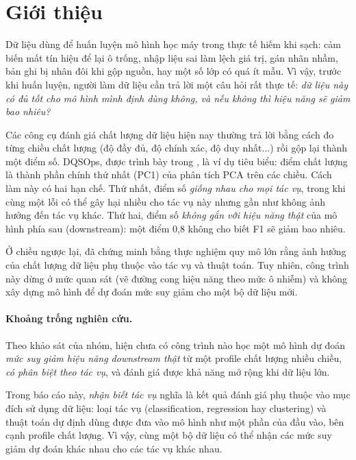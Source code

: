 \section{Giới thiệu}
\label{sec:gioi-thieu}

Dữ liệu dùng để huấn luyện mô hình học máy trong thực tế hiếm khi sạch: cảm biến mất tín hiệu để lại ô trống, nhập liệu sai làm lệch giá trị, gán nhãn nhầm, bản ghi bị nhân đôi khi gộp nguồn, hay một số lớp có quá ít mẫu. Vì vậy, trước khi huấn luyện, người làm dữ liệu cần trả lời một câu hỏi rất thực tế: \emph{dữ liệu này có đủ tốt cho mô hình mình định dùng không, và nếu không thì hiệu năng sẽ giảm bao nhiêu?}

Các công cụ đánh giá chất lượng dữ liệu hiện nay thường trả lời bằng cách đo từng chiều chất lượng (độ đầy đủ, độ chính xác, độ duy nhất...) rồi gộp lại thành một điểm số. DQSOps, được trình bày trong \bbDQS{}, là ví dụ tiêu biểu: điểm chất lượng là thành phần chính thứ nhất (PC1) của phân tích PCA trên các chiều. Cách làm này có hai hạn chế. Thứ nhất, điểm số \emph{giống nhau cho mọi tác vụ}, trong khi cùng một lỗi có thể gây hại nhiều cho tác vụ này nhưng gần như không ảnh hưởng đến tác vụ khác. Thứ hai, điểm số \emph{không gắn với hiệu năng thật} của mô hình phía sau (downstream): một điểm 0,8 không cho biết F1 sẽ giảm bao nhiêu.

Ở chiều ngược lại, \bbMoh{} đã chứng minh bằng thực nghiệm quy mô lớn rằng ảnh hưởng của chất lượng dữ liệu phụ thuộc vào tác vụ và thuật toán. Tuy nhiên, công trình này dừng ở mức quan sát (vẽ đường cong hiệu năng theo mức ô nhiễm) và không xây dựng mô hình để dự đoán mức suy giảm cho một bộ dữ liệu mới.

\paragraph{Khoảng trống nghiên cứu.} Theo khảo sát của nhóm, hiện chưa có công trình nào học một mô hình dự đoán \emph{mức suy giảm hiệu năng downstream thật} từ một profile chất lượng nhiều chiều, \emph{có phân biệt theo tác vụ}, và đánh giá được khả năng mở rộng khi dữ liệu lớn.

Trong báo cáo này, \emph{nhận biết tác vụ} nghĩa là kết quả đánh giá phụ thuộc vào mục đích sử dụng dữ liệu: loại tác vụ (classification, regression hay clustering) và thuật toán dự định dùng được đưa vào mô hình như một phần của đầu vào, bên cạnh profile chất lượng. Vì vậy, cùng một bộ dữ liệu có thể nhận các mức suy giảm dự đoán khác nhau cho các tác vụ khác nhau.


